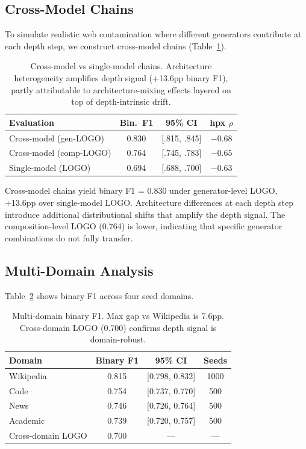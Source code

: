 \documentclass[11pt,a4paper]{article}
\begin{document}
\subsection{Cross-Model Chains}
\label{sec:cross_model}

To simulate realistic web contamination where different generators contribute at each depth step, we construct cross-model chains (Table~\ref{tab:cross_model}).

\begin{table}[t]
\centering
\small
\begin{tabular}{lccc}
\toprule
\textbf{Evaluation} & \textbf{Bin.~F1} & \textbf{95\% CI} & \textbf{hpx $\rho$} \\
\midrule
Cross-model (gen-LOGO) & 0.830 & [.815, .845] & $-0.68$ \\
Cross-model (comp-LOGO) & 0.764 & [.745, .783] & $-0.65$ \\
Single-model (LOGO) & 0.694 & [.688, .700] & $-0.63$ \\
\bottomrule
\end{tabular}
\caption{Cross-model vs single-model chains. Architecture heterogeneity amplifies depth signal (+13.6pp binary F1), partly attributable to architecture-mixing effects layered on top of depth-intrinsic drift.}
\label{tab:cross_model}
\end{table}

Cross-model chains yield binary F1 = 0.830 under generator-level LOGO, +13.6pp over single-model LOGO. Architecture differences at each depth step introduce additional distributional shifts that amplify the depth signal. The composition-level LOGO (0.764) is lower, indicating that specific generator combinations do not fully transfer.

\subsection{Multi-Domain Analysis}
\label{sec:domains}

Table~\ref{tab:domains} shows binary F1 across four seed domains.

\begin{table}[t]
\centering
\small
\begin{tabular}{lccc}
\toprule
\textbf{Domain} & \textbf{Binary F1} & \textbf{95\% CI} & \textbf{Seeds} \\
\midrule
Wikipedia & 0.815 & [0.798, 0.832] & 1000 \\
Code & 0.754 & [0.737, 0.770] & 500 \\
News & 0.746 & [0.726, 0.764] & 500 \\
Academic & 0.739 & [0.720, 0.757] & 500 \\
\midrule
Cross-domain LOGO & 0.700 & --- & --- \\
\bottomrule
\end{tabular}
\caption{Multi-domain binary F1. Max gap vs Wikipedia is 7.6pp. Cross-domain LOGO (0.700) confirms depth signal is domain-robust.}
\label{tab:domains}
\end{table}
\end{document}
